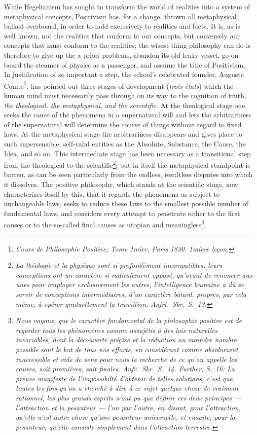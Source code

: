 \documentclass[12pt]{article}
\begin{document}
\noindent
While Hegelianism has sought to transform the world of realities into a
system of metaphysical concepts, Positivism has, for a change, thrown all
metaphysical ballast overboard, in order to hold exclusively to realities
and facts. It is, as is well known, not the realities that conform to our
concepts, but conversely our concepts that must conform to the realities;
the wisest thing philosophy can do is therefore to give up the a priori
problems, abandon its old leaky vessel, go on board the steamer of physics
as a passenger, and assume the title of Positivism. In justification of so
important a step, the school's celebrated founder, Auguste
Comte\footnote{\textit{Cours de Philosophie Positive; Tome 1mier, Paris
1830. 1miere leçon.}}, has pointed out three stages of development
(\textit{trois états}) which the human mind must necessarily pass through on
its way to the cognition of truth, \emph{the theological, the metaphysical,
and the scientific}. At the theological stage one seeks the cause of the
phenomena in a supernatural will and
lets the arbitrariness of the supernatural will determine the course of
things without regard to fixed laws. At the metaphysical stage the
arbitrariness disappears and gives place to such supersensible, self-valid
entities as the Absolute, Substance, the Cause, the Idea, and so on. This
intermediate stage has been necessary as a transitional step from the
theological to the scientific\footnote{\textit{La théologie et la physique
sont si profondément incompatibles, leurs conceptions ont un caractère si
radicalement opposé, qu'avant de renoncer aux unes pour employer
exclusivement les autres, l'intelligence humaine a dû se servir de
conceptions intermédiaires, d'un caractère bâtard, propres, par cela même, à
opérer graduellement la transition. Anfrt.\ Skr.\ S.\ 13.}}; but in itself
the metaphysical standpoint is barren, as can be seen particularly from the
endless, resultless disputes into which it dissolves. The positive
philosophy, which stands at the scientific stage, now characterizes itself
by this, that it regards the phenomena as subject to unchangeable laws,
seeks to reduce these laws to the smallest possible number of fundamental
laws, and considers every attempt to penetrate either to the first causes or
to the so-called final causes as utopian and
meaningless\footnote{\textit{Nous voyons, que le caractère fondamental de la
philosophie positive est de regarder tous les phénomènes comme assujétis à
des \emph{lois} naturelles invariables, dont la découverte préçise et la
réduction au moindre nombre possible sont le but de tous nos efforts, en
considérant comme absolument inaccessible et vide de sens pour nous la
recherche de ce qu'on appelle les \emph{causes}, soit premières, soit
finales. Anfr.\ Skr.\ S.\ 14. Further, S.\ 16: La preuve manifeste de
l'impossibilté d'obtenir de telles solutions, c'est que, toutes les fois
qu'on a cherché à dire à ce sujet quelque chose de vraiment rationnel, les
plus grands esprits n'ont pu que définir ces deux principes --- l'attraction
et la pesanteur --- l'un par l'autre, en disant, pour l'attraction, qu'elle
n'est autre chose qu'une pesanteur universelle, et ensuite, pour la
pesanteur, qu'elle consiste simplement dans l'attraction terrestre.}}.
\end{document}
